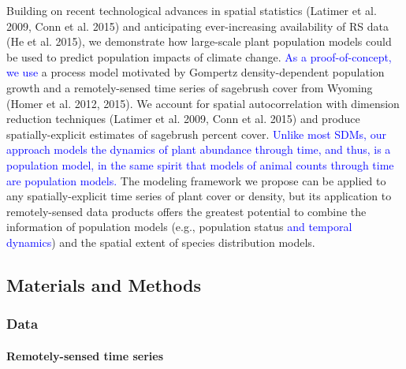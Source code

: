 \documentclass[12pt,]{article}
\begin{document}
Building on recent technological advances in spatial statistics (Latimer
et al. 2009, Conn et al. 2015) and anticipating ever-increasing
availability of RS data (He et al. 2015), we demonstrate how large-scale
plant population models could be used to predict population impacts of
climate change. \textcolor{blue}{As a proof-of-concept, we use} a
process model motivated by Gompertz density-dependent population growth
and a remotely-sensed time series of sagebrush cover from Wyoming (Homer
et al. 2012, 2015). We account for spatial autocorrelation with
dimension reduction techniques (Latimer et al. 2009, Conn et al. 2015)
and produce spatially-explicit estimates of sagebrush percent cover.
\textcolor{blue}{Unlike most SDMs, our approach models the dynamics of plant abundance through time, and thus, is a population model, in the same spirit that models of animal counts through time are population models.}
The modeling framework we propose can be applied to any
spatially-explicit time series of plant cover or density, but its
application to remotely-sensed data products offers the greatest
potential to combine the information of population models (e.g.,
population status \textcolor{blue}{and temporal dynamics}) and the
spatial extent of species distribution models.

\subsection{Materials and Methods}\label{materials-and-methods}

\subsubsection{Data}\label{data}

\paragraph{Remotely-sensed time
series}\label{remotely-sensed-time-series}
\end{document}
